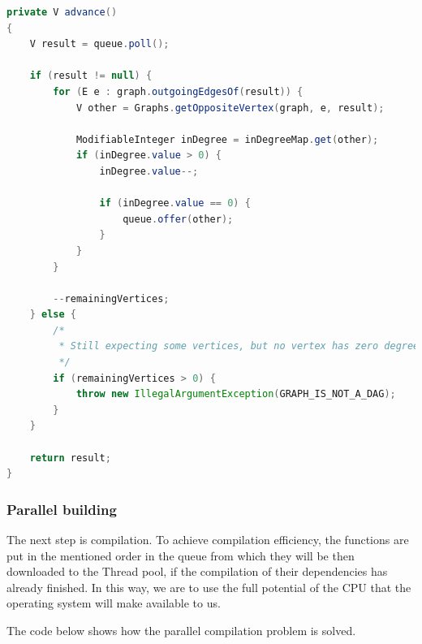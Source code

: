\begin{lstlisting}[language=Java, frame=single]
private V advance()
{
    V result = queue.poll();

    if (result != null) {
        for (E e : graph.outgoingEdgesOf(result)) {
            V other = Graphs.getOppositeVertex(graph, e, result);

            ModifiableInteger inDegree = inDegreeMap.get(other);
            if (inDegree.value > 0) {
                inDegree.value--;

                if (inDegree.value == 0) {
                    queue.offer(other);
                }
            }
        }

        --remainingVertices;
    } else {
        /*
         * Still expecting some vertices, but no vertex has zero degree.
         */
        if (remainingVertices > 0) {
            throw new IllegalArgumentException(GRAPH_IS_NOT_A_DAG);
        }
    }

    return result;
}
\end{lstlisting}

\hypertarget{parallel-building}{%
\subsubsection{Parallel building}\label{parallel-building}}

The next step is compilation. To achieve compilation efficiency, the
functions are put in the mentioned order in the queue from which they
will be then downloaded to the Thread pool, if the compilation of their
dependencies has already finished. In this way, we are to use the full
potential of the CPU that the operating system will make available to
us.

The code below shows how the parallel compilation problem is solved.

